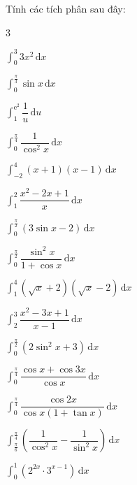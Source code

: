 \begin{bt}%
	Tính các tích phân  sau đây:
	\begin{enumEX}{3}
		 \item $\displaystyle\int_0^3{3x^2\mathrm{\,d}x}$
		\item $\displaystyle\int_0^{\tfrac{\pi }3}{\sin x\mathrm{\,d}x}$ 
		 \item $\displaystyle\int_1^{\mathrm{e}^2}{\dfrac1u} \mathrm{\,d}u$
		\item $\displaystyle\int_0^{\tfrac{\pi  }4}{\dfrac1{{{\cos }^2}x}\mathrm{\,d}x}$
		\item $\displaystyle\int_{-2}^4{\left(x+1\right)\left(x-1\right)}\mathrm{\,d}x$ 
		\item $\displaystyle\int_1^2{\dfrac{{x^2}-2x+1}x}  \mathrm{\,d}x$
		\item  $\displaystyle\int_0^{\tfrac\pi2}{\left(3\sin x-2\right)} \mathrm{\,d}x$
		 \item $\displaystyle\int_0^{\tfrac\pi2}{\dfrac{{{\sin }^2}x}{1+\cos x}} \mathrm{\,d}x$
		\item $\displaystyle\int_1^4{\left(\sqrt  x+2\right)\left(\sqrt x-2\right)}\mathrm{\,d}x$
		 \item $\displaystyle\int_2^3{\dfrac{{x^2}-3x+1}{x-1}\mathrm{\,d}x}$
		\item $\displaystyle\int_0^{\tfrac\pi2}{\left(2{{\sin  }^2}x+3\right)}\mathrm{\,d}x$
		\item $\displaystyle\int_0^{\tfrac{\pi }4}{\dfrac{\cos x+\cos3x}{\cos  x}}\mathrm{\,d}x$
		\item $\displaystyle\int_0^{\tfrac{\pi }4}{\dfrac{\cos2x}{\cos x\left(1+\tan x\right)}}\mathrm{\,d}x$ 
		 \item $\displaystyle\int_{\tfrac{\pi }6}^{\tfrac{\pi }4}{\left(\dfrac1{\cos^2x}-\dfrac1{\sin^2x}\right)\mathrm{\,d}x}$
		\item  $\displaystyle\int_0^1{\left({2^{2x}}\cdot3^{x-1}\right)\mathrm{\,d}x}$
	\end{enumEX}
\end{bt}
